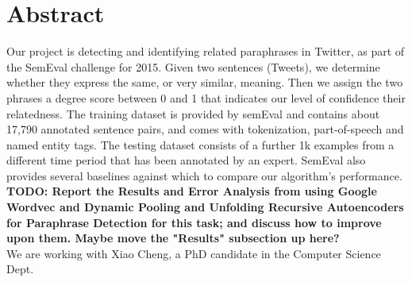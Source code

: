 \documentclass[conference]{IEEEtran}
\begin{document}
\maketitle




%
\IEEEpeerreviewmaketitle



\section{Abstract}
Our project is detecting and identifying related paraphrases in Twitter, as part of the SemEval challenge for 2015.   Given two sentences (Tweets), we determine whether they express the same, or very similar, meaning. Then we assign the two phrases a degree score between 0 and 1 that indicates our level of confidence their relatedness.  The training dataset is provided by semEval and contains about 17,790 annotated sentence pairs, and comes with tokenization, part-of-speech and named entity tags.  The testing dataset consists of a further 1k examples from a different time period that has been annotated by an expert.  SemEval also provides several baselines against which to compare our algorithm's performance. \\ 

\textbf{TODO: Report the Results and Error Analysis from using Google Wordvec and Dynamic Pooling and Unfolding Recursive Autoencoders for Paraphrase Detection for this task; and discuss how to improve upon them. Maybe move the "Results" subsection up here?}\\
We are working with  Xiao Cheng, a PhD candidate in the Computer Science Dept.
\end{document}
